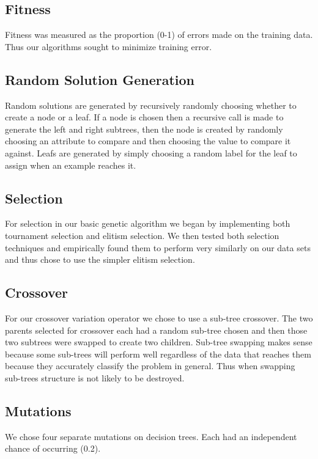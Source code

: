 \documentclass{acm_proc_article-sp}
\begin{document}
\subsection{Fitness}

Fitness was measured as the proportion (0-1) of errors made on the training data. Thus our algorithms sought to minimize training error.

\subsection{Random Solution Generation}

Random solutions are generated by recursively randomly choosing whether to create a node or a leaf. If a node is chosen then a recursive call is made to generate the left and right subtrees, then the node is created by randomly choosing an attribute to compare and then choosing the value to compare it against. Leafs are generated by simply choosing a random label for the leaf to assign when an example reaches it.

\subsection{Selection}

For selection in our basic genetic algorithm we began by implementing both tournament selection and elitism selection. We then tested both selection techniques and empirically found them to perform very similarly on our data sets and thus chose to use the simpler elitism selection.

\subsection{Crossover}

For our crossover variation operator we chose to use a sub-tree crossover. The two parents selected for crossover each had a random sub-tree chosen and then those two subtrees were swapped to create two children. Sub-tree swapping makes sense because some sub-trees will perform well regardless of the data that reaches them because they accurately classify the problem in general. Thus when swapping sub-trees structure is not likely to be destroyed.

\subsection{Mutations}

We chose four separate mutations on decision trees. Each had an independent chance of occurring (0.2).
\end{document}
